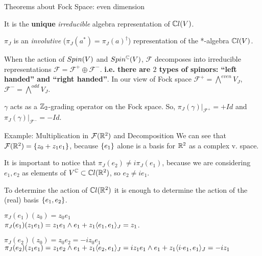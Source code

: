\begin{frame}{Theorems about Fock Space: even dimension} %
    \begin{theorem} It is the \textbf{unique} \emph{irreducible} algebra representation of $\mathbb C l(V)$.\end{theorem}%

    \begin{theorem}$\pi_J$ is an \emph{involutive} ($\pi_J(a^*) = \pi_J(a)^\dagger$) representation of the *-algebra $\mathbb C l(V)$.\end{theorem}%
    
    \begin{theorem}
    When the action of $Spin(V)$ and $Spin^\mathbb C(V)$, $\mathcal F$ decomposes into irreducible representations $\mathcal F = \mathcal F^+ \oplus \mathcal F^-$. \textbf{i.e. there are $2$ types of spinors: ``left handed'' and ``right handed''}. \tiny {In our view of Fock space $\mathcal F^+ = \bigwedge^{even}V_J$, $\mathcal F^- = \bigwedge^{odd}V_J$. }
    \end{theorem}
    
    \begin{proposition} $\gamma$ acts as a $\mathbb Z_2$-grading operator on the Fock space. So,  $\pi_J(\gamma)|_{\mathcal F^+} = +Id$ and $\pi_J(\gamma)|_{\mathcal F^-} = -Id$. \end{proposition}%

\end{frame}

\begin{frame}{Example: Multiplication in $\mathcal F(\mathbb R^2)$ and Decomposition} %
    We can see that $\mathcal F(\mathbb R^2) = \{z_0 + z_1 e_1\}$, because $\{e_1\}$ alone is a basis for $\mathbb R^2$ as a complex v. space.
    
    It is important to notice that $\pi_J(e_2) \neq i \pi_J(e_1)$, because we are considering $e_1, e_2$ as elements of $V^\mathbb C \subset \mathbb C l(\mathbb R^2)$, so $e_2 \neq i e_1$.
    
    To determine the action of $\mathbb C l(\mathbb R^2)$ it is enough to determine the action of the (real) basis $\{e_1, e_2\}$.
    
    
    $\pi_J(e_1) (z_0) = z_0 e_1$\\
    $\pi_J(e_1)(z_1 e_1) = z_1 e_1 \wedge e_1 + z_1 \langle e_1, e_1\rangle_J = z_1$.
    
    
    $\pi_J(e_2) (z_0) = z_0 e_2 = -i z_0 e_1$ \\
    $\pi_J(e_2)(z_1 e_1) = z_1 e_2 \wedge e_1 + z_1 \langle e_2, e_1\rangle_J = i z_1 e_1 \wedge e_1 + z_1\langle i\tiny{ \cdot }e_1, e_1 \rangle_J = -i z_1$
    
\end{frame}

